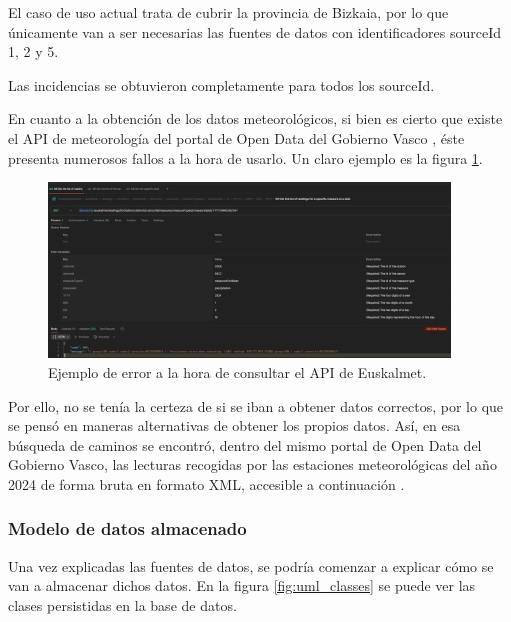El caso de uso actual trata de cubrir la provincia de Bizkaia, por lo que únicamente van a ser necesarias las fuentes de datos con identificadores sourceId 1, 2 y 5.

Las incidencias se obtuvieron completamente para todos los sourceId.

En cuanto a la obtención de los datos meteorológicos, si bien es cierto que existe el API de meteorología del portal de Open Data del Gobierno Vasco \cite{apiMeteo}, éste presenta numerosos fallos a la hora de usarlo. Un claro ejemplo es la figura \ref{fig:euskalmet_api_error}. 

\begin{figure}[H]
	\centering
	\includegraphics[width=0.95\textwidth]{includes/error_api_euskalmet.png}
	\caption{Ejemplo de error a la hora de consultar el API de Euskalmet.}
	\label{fig:euskalmet_api_error}
\end{figure}

Por ello, no se tenía la certeza de si se iban a obtener datos correctos, por lo que se pensó en maneras alternativas de obtener los propios datos. Así, en esa búsqueda de caminos se encontró, dentro del mismo portal de Open Data del Gobierno Vasco, las lecturas recogidas por las estaciones meteorológicas del año 2024 de forma bruta en formato XML, accesible a continuación \cite{xmlMeteo2024}. 

\subsubsection{Modelo de datos almacenado}

Una vez explicadas las fuentes de datos, se podría comenzar a explicar cómo se van a almacenar dichos datos. En la figura \ref{fig:uml_classes} se puede ver las clases persistidas en la base de datos.


